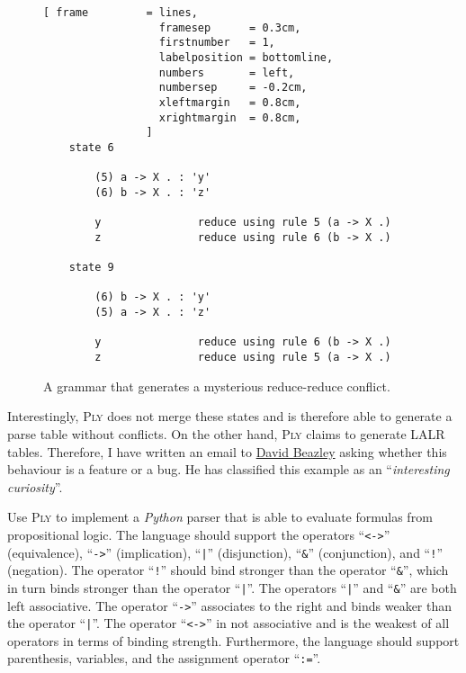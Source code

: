 \begin{figure}[!ht]
\centering
\begin{Verbatim}[ frame         = lines, 
                  framesep      = 0.3cm, 
                  firstnumber   = 1,
                  labelposition = bottomline,
                  numbers       = left,
                  numbersep     = -0.2cm,
                  xleftmargin   = 0.8cm,
                  xrightmargin  = 0.8cm,
                ]
    state 6
    
        (5) a -> X . : 'y'
        (6) b -> X . : 'z'
    
        y               reduce using rule 5 (a -> X .)
        z               reduce using rule 6 (b -> X .)

    state 9
    
        (6) b -> X . : 'y'
        (5) a -> X . : 'z'
    
        y               reduce using rule 6 (b -> X .)
        z               reduce using rule 5 (a -> X .)
\end{Verbatim}
\vspace*{-0.3cm}
\caption{A grammar that generates a mysterious reduce-reduce conflict.}
\label{fig:Mysterious-Conflicts.parser.out}
\end{figure}
\vspace*{0.3cm}

Interestingly, \textsc{Ply} does not merge these states and is therefore able to generate a parse table without
conflicts.  On the other hand, \textsc{Ply} claims to generate LALR tables.  Therefore, I have written an
email to \href{https://en.wikipedia.org/wiki/David_M._Beazley}{David Beazley} asking whether this behaviour is
a feature or a bug.  He has classified this example as an ``\emph{interesting curiosity}''.


\exerciseEng
Use \textsc{Ply} to implement a \textsl{Python} parser that is able to evaluate formulas from propositional logic.
The language should support the operators ``\texttt{<->}'' (equivalence), ``\texttt{->}'' (implication),
``\texttt{|}'' (disjunction), ``\texttt{\&}'' (conjunction), and 
``\texttt{!}'' (negation).  The operator ``\texttt{!}'' should bind stronger than the operator ``\texttt{\&}'',
which in turn binds stronger than the operator ``\texttt{|}''.  The operators ``\texttt{|}'' and ``\texttt{\&}''
are both left associative.  The operator ``\texttt{->}'' associates to the right and binds weaker than the
operator ``\texttt{|}''. 
The operator ``\texttt{<->}'' in not associative and is the weakest of all operators in terms of binding strength.
Furthermore, the language should support parenthesis, variables, and the assignment operator ``\texttt{:=}''.  \eox


